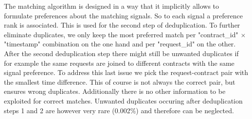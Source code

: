 \documentclass[12pt,titlepage]{article}
\begin{document}
The matching algorithm is designed in a way that it implicitly allows to formulate preferences about the matching signals. So to each signal a preference rank is associated. This is used for the second step of deduplication. To further eliminate duplicates, we only keep the most preferred match per "contract\_id" $\times$ "timestamp" combination on the one hand and per "request\_id" on the other. \\
After the second deduplication step there might still be unwanted duplicates if for example the same requests are joined to different contracts with the same signal preference. To address this last issue we pick the request-contract pair with the smallest time difference. This of course is not always the correct pair, but ensures wrong duplicates. Additionally there is no other information to be exploited for correct matches. Unwanted duplicates occuring after deduplication steps 1 and 2 are however very rare (0.002\%) and therefore can be neglected. \\
\end{document}
